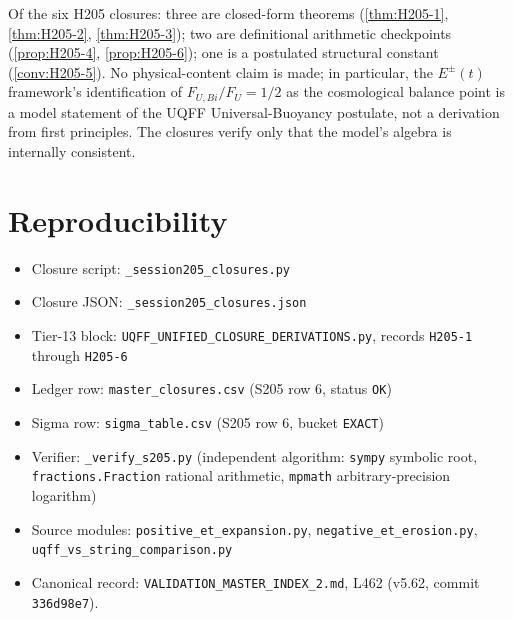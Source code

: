 \documentclass[11pt,letterpaper]{article}
\theoremstyle{definition}
\begin{document}
Of the six H205 closures: three are closed-form theorems
(\ref{thm:H205-1}, \ref{thm:H205-2}, \ref{thm:H205-3}); two are definitional
arithmetic checkpoints (\ref{prop:H205-4}, \ref{prop:H205-6}); one is a
postulated structural constant (\ref{conv:H205-5}). No physical-content claim
is made; in particular, the $E^{\pm}(t)$ framework's identification of
$F_{U,Bi}/F_U = 1/2$ as the cosmological balance point is a model statement
of the UQFF Universal-Buoyancy postulate, not a derivation from first
principles. The closures verify only that the model's algebra is internally
consistent.

\section{Reproducibility}

\begin{itemize}
\item Closure script: \texttt{\_session205\_closures.py}
\item Closure JSON:   \texttt{\_session205\_closures.json}
\item Tier-13 block:  \texttt{UQFF\_UNIFIED\_CLOSURE\_DERIVATIONS.py},
                      records \texttt{H205-1} through \texttt{H205-6}
\item Ledger row:     \texttt{master\_closures.csv} (S205 row 6, status \texttt{OK})
\item Sigma row:      \texttt{sigma\_table.csv}     (S205 row 6, bucket \texttt{EXACT})
\item Verifier:       \texttt{\_verify\_s205.py} (independent algorithm:
                      \texttt{sympy} symbolic root, \texttt{fractions.Fraction}
                      rational arithmetic, \texttt{mpmath} arbitrary-precision
                      logarithm)
\item Source modules: \texttt{positive\_et\_expansion.py},
                      \texttt{negative\_et\_erosion.py},
                      \texttt{uqff\_vs\_string\_comparison.py}
\item Canonical record: \texttt{VALIDATION\_MASTER\_INDEX\_2.md}, L462 (v5.62,
                        commit \texttt{336d98e7}).
\end{itemize}
\end{document}

